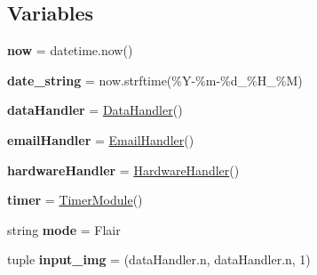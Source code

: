 \subsection*{Variables}
\begin{DoxyCompactItemize}
\item 
\mbox{\label{namespaceTrainModels2_ac12d3a5d86861607122bb446c266ee15}} 
{\bfseries now} = datetime.\+now()
\item 
\mbox{\label{namespaceTrainModels2_a25229be5101d04ae3db6e820fb6ced61}} 
{\bfseries date\+\_\+string} = now.\+strftime(\textquotesingle{}\%Y-\/\%m-\/\%d\+\_\+\%H\+\_\+\%M\textquotesingle{})
\item 
\mbox{\label{namespaceTrainModels2_a20763c4ab323ebf47f3c2040a81bd7ab}} 
{\bfseries data\+Handler} = \mbox{\hyperlink{classDataHandler_1_1DataHandler}{Data\+Handler}}()
\item 
\mbox{\label{namespaceTrainModels2_a4f39de3e41199f398e92ad6866bfb98e}} 
{\bfseries email\+Handler} = \mbox{\hyperlink{classEmailHandler_1_1EmailHandler}{Email\+Handler}}()
\item 
\mbox{\label{namespaceTrainModels2_a3a850f7b7cbaabf15286c13f26e08b3e}} 
{\bfseries hardware\+Handler} = \mbox{\hyperlink{classHardwareHandler_1_1HardwareHandler}{Hardware\+Handler}}()
\item 
\mbox{\label{namespaceTrainModels2_a24404e50386ebc4f2bc8e5bbd934852c}} 
{\bfseries timer} = \mbox{\hyperlink{classTimerModule_1_1TimerModule}{Timer\+Module}}()
\item 
\mbox{\label{namespaceTrainModels2_a6672e5ea6f12df737f37bcc3acb1b396}} 
string {\bfseries mode} = \textquotesingle{}Flair\textquotesingle{}
\item 
\mbox{\label{namespaceTrainModels2_af57893ff4df776233a6e985c47b99c9e}} 
tuple {\bfseries input\+\_\+img} = (data\+Handler.\+n, data\+Handler.\+n, 1)
\item 
\mbox{\label{namespaceTrainModels2_a1d0834fc18a999cccf9af8a539b78120}} 

\end{DoxyCompactItemize}
